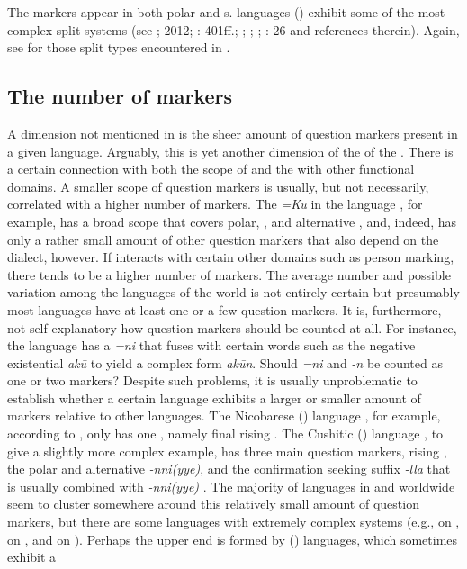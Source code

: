 The markers appear in both polar and s.  languages () exhibit some of the most complex split systems (see \citealt{Amha2007}; 2012; \citealt{Hellenthal2010}: 401ff.; \citealt{Köhler2013}; \citeyear{Köhler2016}; \citealt{Treis2014}; \citealt{Hölzl2016a}: 26 and references therein). Again, see  for those split types encountered in .

\subsection{The number of markers}\label{sec:4.2.4}

A dimension not mentioned in \cite{Hölzl2016a} is the sheer amount of question markers present in a given language. Arguably, this is yet another dimension of the  of the . There is a certain connection with both the scope of  and the  with other functional domains. A smaller scope of question markers is usually, but not necessarily, correlated with a higher number of markers. The  \textit{=Ku} in the  language , for example, has a broad scope that covers polar, , and alternative , and, indeed,  has only a rather small amount of other question markers that also depend on the dialect, however. If  interacts with certain other domains such as person marking, there tends to be a higher number of markers. The average number and possible variation among the languages of the world is not entirely certain but presumably most languages have at least one or a few question markers. It is, furthermore, not self-explanatory how question markers should be counted at all. For instance, the  language  has a  \textit{=ni} that fuses with certain words such as the negative existential \textit{ak\=u} to yield a complex form \textit{ak\=un}. Should \textit{=ni} and \textit{-n} be counted as one or two markers? Despite such problems, it is usually unproblematic to establish whether a certain language exhibits a larger or smaller amount of markers relative to other languages. The Nicobarese () language , for example, according to \citet[114]{Rajasingh2014}, only has one , namely final rising . The Cushitic () language , to give a slightly more complex example, has three main question markers, rising  , the polar and alternative  \textit{-nni(yye)}, and the confirmation seeking suffix \textit{-lla} that is usually combined with \textit{-nni(yye)} \citep{Sulamo2013}. The majority of languages in  and worldwide seem to cluster somewhere around this relatively small amount of question markers, but there are some languages with extremely complex  systems (e.g.,  on ,  on , and  on ). Perhaps the upper end is formed by  () languages, which sometimes exhibit a 